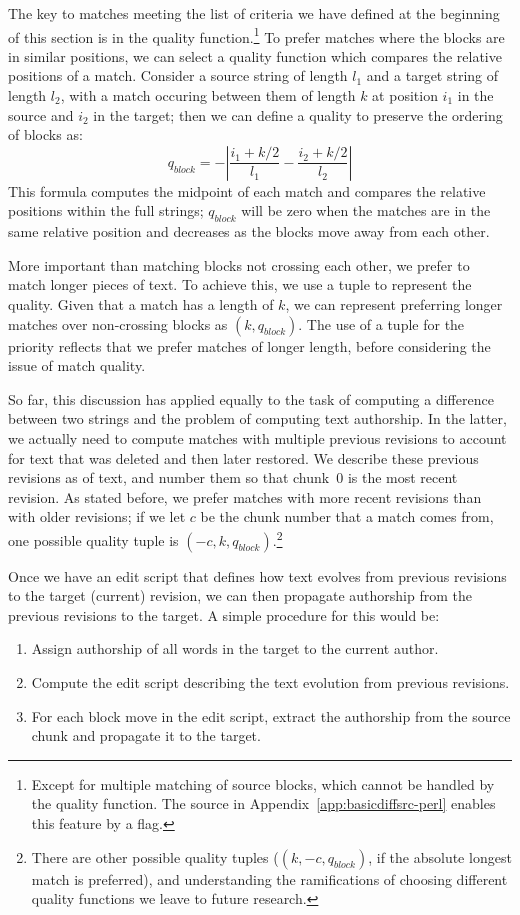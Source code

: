 The key to matches meeting the list of criteria we have
defined at the beginning of this section is in the quality
function.\footnote{Except for multiple matching of source blocks, which
cannot be handled by the quality function.  The source in
Appendix~\ref{app:basicdiffsrc-perl} enables this feature by a flag.}
To prefer matches where the blocks are in similar positions,
we can select a quality function which compares the relative
positions of a match.
Consider a source string of length $l_1$ and a target string of
length $l_2$, with a match occuring between them of length $k$
at position $i_1$ in the source and $i_2$ in the target;
then we can define a quality to preserve the ordering of blocks as:
\begin{equation}
q_{block} = -\left| \frac{i_1 + k/2}{l_1} - \frac{i_2 + k/2}{l_2} \right|
\end{equation}
This formula computes the midpoint of each match and compares
the relative positions within the full strings; $q_{block}$ will be
zero when the matches are in the same relative position
and decreases as the blocks move away from each other.

More important than matching blocks not crossing each other,
we prefer to match longer pieces of text.
To achieve this, we use a tuple to represent the quality.
Given that a match has a length of $k$, we can represent preferring
longer matches over non-crossing blocks as $(k, q_{block})$.
The use of a tuple for the priority reflects that we prefer
matches of longer length, before considering the issue
of match quality.

So far, this discussion has applied equally to the task of
computing a difference between two strings and the problem of computing
text authorship.
In the latter, we actually
need to compute matches with multiple previous revisions
to account for text that was deleted and then later restored.
We describe these previous revisions as  of text,
and number them so that chunk~0 is the most recent revision.
As stated before, we prefer matches with more recent revisions
than with older
revisions; if we let $c$ be the chunk number that a match comes from,
one possible quality tuple is $(-c, k, q_{block})$.\footnote{%
There are other possible quality tuples (\eg $(k, -c, q_{block})$,
if the absolute longest match is preferred), and
understanding the ramifications of choosing different quality
functions we leave to future research.}

Once we have an edit script that defines how text evolves from
previous revisions to the target (current) revision, we can then propagate
authorship from the previous revisions to the target.
A simple procedure for this would be:
\begin{enumerate}
\item Assign authorship of all words in the target to the current author.
\item Compute the edit script describing the text evolution from
    previous revisions.
\item For each block move in the edit script, extract the authorship
    from the source chunk and propagate it to the target.
\end{enumerate}

